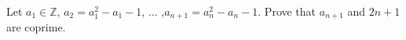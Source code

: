 Let $a_1\in\mathbb{Z}$, $a_2=a_1^2-a_1-1$, $\dots$ ,$a_{n+1}=a_n^2-a_n-1$. Prove that $a_{n+1}$ and $2n+1$ are coprime.